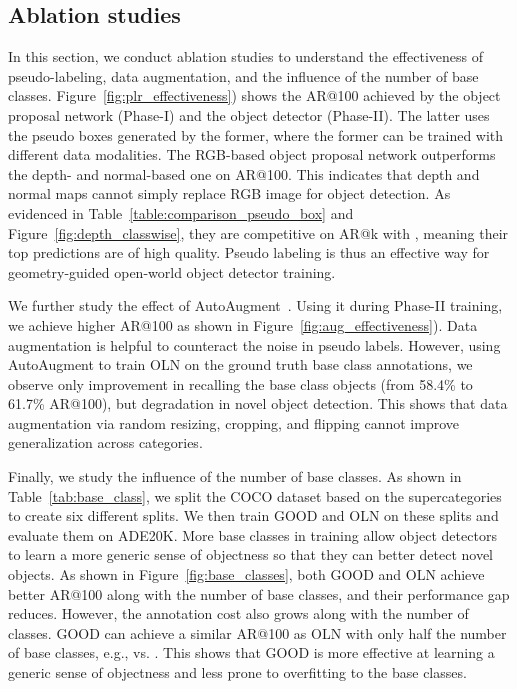 \documentclass{article} \usepackage{iclr2023_conference,times}
\begin{document}
\subsection{Ablation studies}\label{sec:ablation}
In this section, we conduct ablation studies to understand the effectiveness of pseudo-labeling, data augmentation, and the influence of the number of base classes. Figure~\ref{fig:plr_effectiveness}) shows the AR@100 achieved by the object proposal network (Phase-I) and the object detector (Phase-II). The latter uses the pseudo boxes generated by the former, where the former can be trained with different data modalities. The RGB-based object proposal network outperforms the depth- and normal-based one on AR@100. This indicates that depth and normal maps cannot simply replace RGB image for object detection. As evidenced in Table~\ref{table:comparison_pseudo_box} and Figure~\ref{fig:depth_classwise}, they are competitive on AR@k with , meaning their top predictions are of high quality. Pseudo labeling is thus an effective way for geometry-guided open-world object detector training. 

We further study the effect of AutoAugment~\citep{cubuk2019autoaugment}. Using it during Phase-II training, we achieve higher AR@100 as shown in Figure~\ref{fig:aug_effectiveness}). Data augmentation is helpful to counteract the noise in pseudo labels. However, using AutoAugment to train OLN on the ground truth base class annotations, we observe only improvement in recalling the base class objects (from 58.4\% to 61.7\% AR@100), but degradation in novel object detection. This shows that data augmentation via random resizing, cropping, and flipping cannot improve generalization across categories. 

Finally, we study the influence of the number of base classes. As shown in Table~\ref{tab:base_class}, we split the COCO dataset based on the supercategories to create six different splits. We then train GOOD and OLN on these splits and evaluate them on ADE20K. More base classes in training allow object detectors to learn a more generic sense of objectness so that they can better detect novel objects. As shown in Figure~\ref{fig:base_classes}, both GOOD and OLN achieve better  AR@100 along with the number of base classes, and their performance gap reduces. However, the annotation cost also grows along with the number of classes. GOOD can achieve a similar AR@100 as OLN with only half the number of base classes, e.g.,  vs. . This shows that GOOD is more effective at learning a generic sense of objectness and less prone to overfitting to the base classes.
\end{document}
